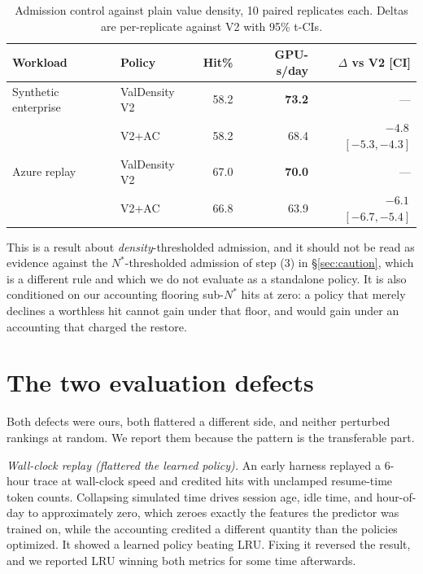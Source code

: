 \documentclass{article}
\begin{document}
\begin{table}[h]
\centering
\caption{Admission control against plain value density, 10 paired replicates each.
Deltas are per-replicate against V2 with 95\% t-CIs.}
\label{tab:ac}
\small
\begin{tabular}{@{}llrrr@{}}
\toprule
Workload & Policy & Hit\% & GPU-s/day & $\Delta$ vs V2 [CI] \\
\midrule
Synthetic enterprise & ValDensity V2 & 58.2 & \textbf{73.2} & --- \\
                     & V2+AC         & 58.2 & 68.4 & $-4.8$\,$[-5.3, -4.3]$ \\
\midrule
Azure replay         & ValDensity V2 & 67.0 & \textbf{70.0} & --- \\
                     & V2+AC         & 66.8 & 63.9 & $-6.1$\,$[-6.7, -5.4]$ \\
\bottomrule
\end{tabular}
\end{table}

This is a result about \emph{density}-thresholded admission, and it should not be read as
evidence against the $N^{*}$-thresholded admission of step (3) in \S\ref{sec:caution},
which is a different rule and which we do not evaluate as a standalone policy. It is also
conditioned on our accounting flooring sub-$N^{*}$ hits at zero: a policy that merely
declines a worthless hit cannot gain under that floor, and would gain under an accounting
that charged the restore.

\section{The two evaluation defects}
\label{app:bugs}

Both defects were ours, both flattered a different side, and neither perturbed rankings at
random. We report them because the pattern is the transferable part.

\emph{Wall-clock replay (flattered the learned policy).} An early harness replayed a
6-hour trace at wall-clock speed and credited hits with unclamped resume-time token
counts. Collapsing simulated time drives session age, idle time, and hour-of-day to
approximately zero, which zeroes exactly the features the predictor was trained on, while
the accounting credited a different quantity than the policies optimized. It showed a
learned policy beating LRU. Fixing it reversed the result, and we reported LRU winning
both metrics for some time afterwards.
\end{document}
